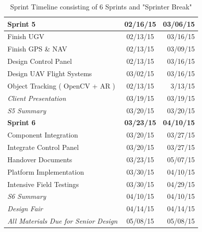 \begin{table}[!bh]
\begin{tabular}{|| l || c | r || }
\textbf{Sprint 5}   & \textbf{02/16/15} & \textbf{03/06/15} \\
\hline
\hspace{15pt}Finish UGV  &  02/13/15   & 03/16/15 \\
\hline
\hspace{15pt}Finish GPS \& NAV   & 02/13/15   & 03/09/15 \\
\hline
\hspace{15pt}Design Control Panel   & 02/13/15   & 03/16/15 \\
\hline
\hspace{15pt}Design UAV Flight Systems   & 03/02/15  &  03/16/15 \\
\hline
\hspace{15pt}Object Tracking ( OpenCV + AR )  &  02/13/15  &  3/13/15 \\
\hline
\hspace{30pt}\textit{Client Presentation}  &  03/19/15   & 03/19/15 \\
\hline
\hspace{30pt}\textit{S5 Summary}   & 03/20/15   & 03/20/15 \\
\hline


\textbf{Sprint 6}  &  \textbf{03/23/15} & \textbf{04/10/15} \\
\hline
\hspace{15pt}Component Integration   & 03/20/15  &  03/27/15 \\
\hline
\hspace{15pt}Integrate Control Panel  &  03/20/15 & 03/27/15 \\
\hline
\hspace{15pt}Handover Documents   & 03/23/15  &  05/07/15 \\
\hline
\hspace{15pt}Platform Implementation  &  03/30/15  &  04/10/15 \\
\hline
\hspace{15pt}Intensive Field Testings   & 03/30/15  &  04/29/15 \\
\hline
\hspace{30pt}\textit{S6 Summary}  &  04/10/15  &  04/10/15 \\
\hline
\hspace{30pt}\textit{Design Fair}  &  04/14/15   & 04/14/15 \\
\hline
\hspace{30pt}\textit{All Materials Due for Senior Design}  &  05/08/15  &  05/08/15 \\
\hline
\end{tabular}
\caption{ Sprint Timeline consisting of 6 Sprints and "Sprinter Break" \label{sprinttimeline}}
\end{table}




